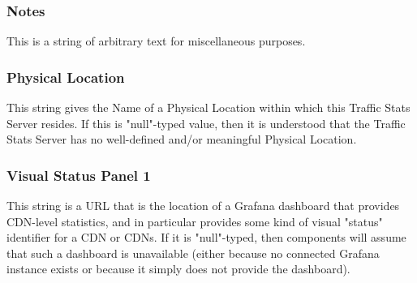 \subsubsection{Notes}
This is a string of arbitrary text for miscellaneous purposes.

\subsubsection{Physical Location}
This string gives the Name of a Physical Location within which this Traffic
Stats Server resides. If this is "null"-typed value, then it is understood that
the Traffic Stats Server has no well-defined and/or meaningful Physical
Location.

\subsubsection{Visual Status Panel 1}
This string is a URL that is the location of a Grafana dashboard that provides
CDN-level statistics, and in particular provides some kind of visual "status"
identifier for a CDN or CDNs. If it is "null"-typed, then components will assume
that such a dashboard is unavailable (either because no connected Grafana
instance exists or because it simply does not provide the dashboard).
